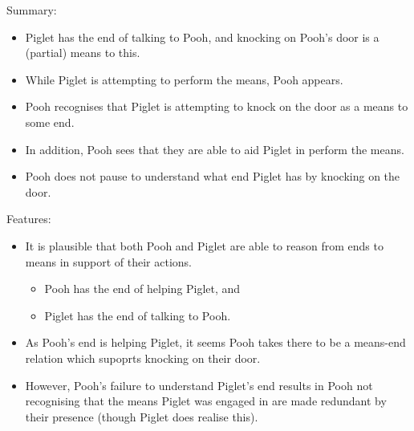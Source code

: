 \documentclass[10pt]{article}
\newcommand{\hozlinedash}[0]{%
  \noindent\hdashrule[0.5ex][c]{\textwidth}{.1pt}{2.5pt}
}
\begin{document}
\hozlinedash

Summary:
\begin{itemize}[noitemsep]
\item Piglet has the end of talking to Pooh, and knocking on Pooh's door is a (partial) means to this.
\item While Piglet is attempting to perform the means, Pooh appears.
\item Pooh recognises that Piglet is attempting to knock on the door as a means to some end.
\item In addition, Pooh sees that they are able to aid Piglet in perform the means.
\item Pooh does not pause to understand what end Piglet has by knocking on the door.
\end{itemize}

Features:
\begin{itemize}[noitemsep]
\item It is plausible that both Pooh and Piglet are able to reason from ends to means in support of their actions.
  \begin{itemize}[noitemsep]
  \item Pooh has the end of helping Piglet, and
  \item Piglet has the end of talking to Pooh.
  \end{itemize}
\item As Pooh's end is helping Piglet, it seems Pooh takes there to be a means-end relation which supoprts knocking on their door.
\item However, Pooh's failure to understand Piglet's end results in Pooh not recognising that the means Piglet was engaged in are made redundant by their presence (though Piglet does realise this).
\end{itemize}





\end{document}
